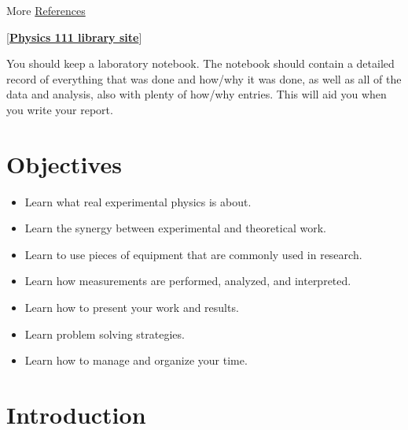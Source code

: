 \documentclass{../lab}
\begin{document}
\noindent More \hyperref[sec:References]{References}

[\href{http://physics111.lib.berkeley.edu/Physics111/Reprints/RUT/RUT\_index.html}{\textbf{Physics 111 library site}}]

You should keep a laboratory notebook. The notebook should contain a detailed record of everything that was done and how/why it was done, as well as all of the data and analysis, also with plenty of how/why entries. This will aid you when you write your report.

\section{Objectives}

\begin{itemize}
    \item Learn what real experimental physics is about.

    \item Learn the synergy between experimental and theoretical work.

    \item Learn to use pieces of equipment that are commonly used in research.

    \item Learn how measurements are performed, analyzed, and interpreted.

    \item Learn how to present your work and results.

    \item Learn problem solving strategies.

    \item Learn how to manage and organize your time.
\end{itemize}

\section{Introduction}
\end{document}
